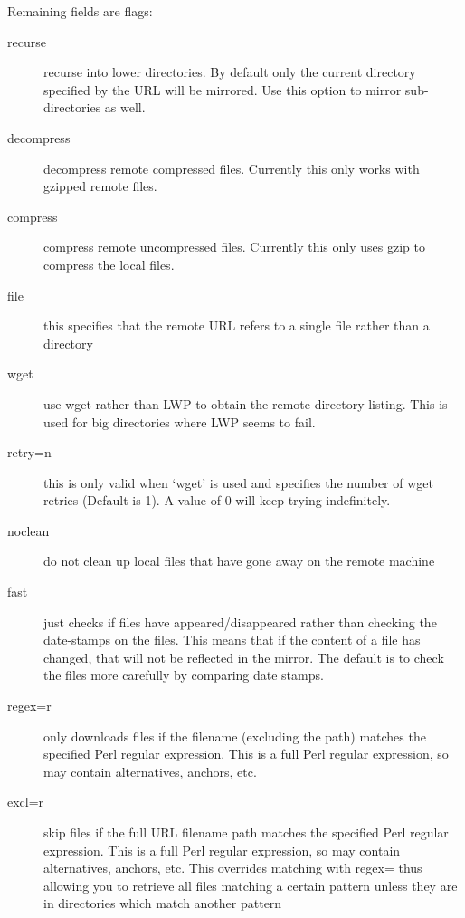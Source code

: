\documentclass{article}
\begin{document}
Remaining fields are flags:
\begin{description}
\item[recurse]    recurse into lower directories. By default only the
  current directory specified by the URL will be mirrored. Use this
  option to mirror sub-directories as well.
\item[decompress] decompress remote compressed files. Currently this
  only works with gzipped remote files.
\item[compress]   compress remote uncompressed files. Currently this
  only uses gzip to compress the local files.
\item[file]       this specifies that the remote URL refers to a
  single file rather than a directory
\item[wget]       use wget rather than LWP to obtain the remote
  directory listing. This is used for big directories where LWP seems
  to fail.
\item[retry=n]    this is only valid when `wget' is used and specifies
                  the number of wget retries (Default is 1).
                  A value of 0 will keep trying indefinitely.
\item[noclean]    do not clean up local files that have gone away on the
                  remote machine
\item[fast] just checks if files have appeared/disappeared rather than
                  checking the date-stamps on the files. This means
                  that if the content of a file has changed, that will
                  not be reflected in the mirror. The default is to
                  check the files more carefully by comparing date
                  stamps.
\item[regex=r]    only downloads files if the filename (excluding
                  the path) matches the specified Perl regular
                  expression. This is a full Perl regular expression,
                  so may contain alternatives, anchors, etc.
\item[excl=r]     skip files if the full URL filename path matches the
                  specified Perl regular expression. This is a full
                  Perl regular expression, so may contain
                  alternatives, anchors, etc. This overrides matching
                  with regex= thus allowing you to retrieve all files
                  matching a certain pattern unless they are in 
                  directories which match another pattern
                  
\end{description}
\end{document}
